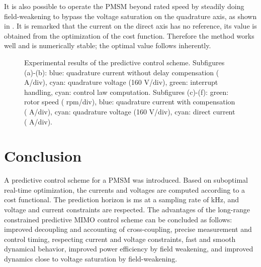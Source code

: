 \documentclass[a4paper,11pt,fleqn]{article}
\begin{document}
It is also possible to operate the PMSM beyond rated speed by steadily doing field-weakening to bypass the voltage saturation on the quadrature axis, as shown in \cite{inhFW}. It is remarked that the current on the direct axis  has no reference, its value is obtained from the optimization of the cost function. Therefore the method works well and is numerically stable; the optimal value follows inherently.


\begin{figure*}[!ht]
\centering
{}
\caption{Experimental results of the predictive control scheme. Subfigures (a)-(b): blue: quadrature current  without delay compensation ( A/div), cyan: quadrature voltage  (160 V/div), green: interrupt handling, cyan: control law computation. Subfigures (c)-(f): green: rotor speed  ( rpm/div), blue: quadrature current  with compensation ( A/div), cyan: quadrature voltage  (160 V/div), cyan: direct current  ( A/div).\label{fig:results}}
\end{figure*}





\section*{Conclusion}
A predictive control scheme for a PMSM was introduced. Based on suboptimal real-time optimization, the currents and voltages are computed according to a cost functional. The prediction horizon is  ms at a sampling rate of  kHz, and voltage and current constraints are respected. The advantages of the long-range constrained predictive MIMO control scheme can be concluded as follows: improved decoupling and accounting of cross-coupling, precise measurement and control timing, respecting current and voltage constraints, fast and smooth dynamical behavior, improved power efficiency by field weakening, and improved dynamics close to voltage saturation by field-weakening.
\end{document}
